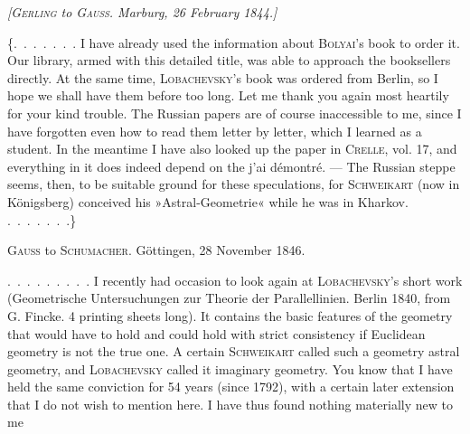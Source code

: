 %
\begin{center}\emph{[\textup{\textsc{Gerling}} to \textup{\textsc{Gauss}}. Marburg, 26 February 1844.]}\end{center}

\{\mbox{.\ .\ .\ .\ .\ .\ .} I have already used the information about \textsc{Bolyai}'s book to order it. Our library, armed with this detailed title, was able to approach the booksellers directly. At the same time, \textsc{Lobachevsky}'s book was ordered from Berlin, so I hope we shall have them before too long. Let me thank you again most heartily for your kind trouble. The Russian papers are of course inaccessible to me, since I have forgotten even how to read them letter by letter, which I learned as a student. In the meantime I have also looked up the paper in \textsc{Crelle}, vol. 17, and everything in it does indeed depend on the j'ai démontré. --- The Russian steppe seems, then, to be suitable ground for these speculations, for \textsc{Schweikart} (now in Königsberg) conceived his »Astral-Geometrie« while he was in Kharkov. \mbox{.\ .\ .\ .\ .\ .\ .}\}

\par\bigskip{}

\begin{center}\textsc{Gauss} to \textsc{Schumacher}. Göttingen, 28 November 1846.\end{center}

\mbox{.\ .\ .\ .\ .\ .\ .\ .\ .} I recently had occasion to look again at \textsc{Lobachevsky}'s short work (Geometrische Untersuchungen zur Theorie der Parallellinien. Berlin 1840, from G. Fincke. 4 printing sheets long). It contains the basic features of the geometry that would have to hold and could hold with strict consistency if Euclidean geometry is not the true one. A certain \textsc{Schweikart} called such a geometry astral geometry, and \textsc{Lobachevsky} called it imaginary geometry. You know that I have held the same conviction for 54 years (since 1792), with a certain later extension that I do not wish to mention here. I have thus found nothing materially new to me

